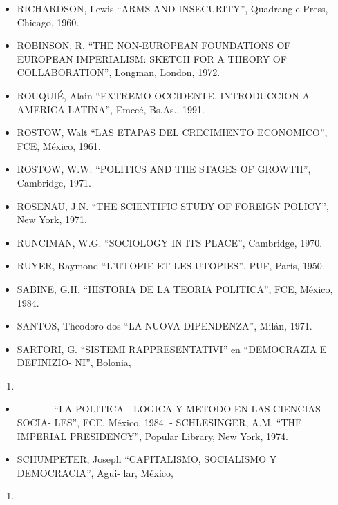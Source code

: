 \documentclass[
]{book}
\providecommand{\tightlist}{%
  \setlength{\itemsep}{0pt}\setlength{\parskip}{0pt}}
\begin{document}
\begin{itemize}
\item
  RICHARDSON, Lewis ``ARMS AND INSECURITY'', Quadrangle Press, Chicago, 1960.
\item
  ROBINSON, R. ``THE NON-EUROPEAN FOUNDATIONS OF EUROPEAN IMPERIALISM:
  SKETCH FOR A THEORY OF COLLABORATION'', Longman, London, 1972.
\item
  ROUQUIÉ, Alain ``EXTREMO OCCIDENTE. INTRODUCCION A AMERICA LATINA'', Emecé,
  Bs.As., 1991.
\item
  ROSTOW, Walt ``LAS ETAPAS DEL CRECIMIENTO ECONOMICO'', FCE, México, 1961.
\item
  ROSTOW, W.W. ``POLITICS AND THE STAGES OF GROWTH'', Cambridge, 1971.
\item
  ROSENAU, J.N. ``THE SCIENTIFIC STUDY OF FOREIGN POLICY'', New York, 1971.
\item
  RUNCIMAN, W.G. ``SOCIOLOGY IN ITS PLACE'', Cambridge, 1970.
\item
  RUYER, Raymond ``L'UTOPIE ET LES UTOPIES'', PUF, París, 1950.
\item
  SABINE, G.H. ``HISTORIA DE LA TEORIA POLITICA'', FCE, México, 1984.
\item
  SANTOS, Theodoro dos ``LA NUOVA DIPENDENZA'', Milán, 1971.
\item
  SARTORI, G. ``SISTEMI RAPPRESENTATIVI'' en ``DEMOCRAZIA E DEFINIZIO- NI'', Bolonia,
\end{itemize}

\begin{enumerate}
\def\labelenumi{\arabic{enumi}.}
\setcounter{enumi}{1968}
\tightlist
\item
\end{enumerate}

\begin{itemize}
\tightlist
\item
  ----------- ``LA POLITICA - LOGICA Y METODO EN LAS CIENCIAS SOCIA- LES'', FCE,
  México, 1984. - SCHLESINGER, A.M. ``THE IMPERIAL PRESIDENCY'', Popular Library, New York, 1974.
\item
  SCHUMPETER, Joseph ``CAPITALISMO, SOCIALISMO Y DEMOCRACIA'', Agui- lar, México,
\end{itemize}

\begin{enumerate}
\def\labelenumi{\arabic{enumi}.}
\setcounter{enumi}{1960}
\tightlist
\item
\end{enumerate}
\end{document}
